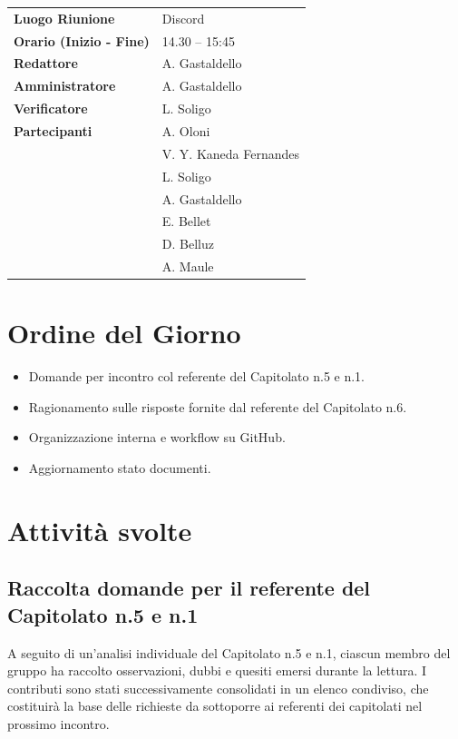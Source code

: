 \documentclass[a4paper,12pt]{article}
\begin{document}
\begin{tabular}{>{\bfseries}p{5cm} | p{10cm}}
Luogo Riunione & Discord \\[6pt]

Orario (Inizio - Fine) & 14.30 -- 15:45 \\[6pt]

Redattore &
  A. Gastaldello\\[6pt]

Amministratore & 
A. Gastaldello\\[6pt]

Verificatore &
L. Soligo\\[6pt]

Partecipanti &
  A. Oloni\\ &
    V. Y. Kaneda Fernandes\\&
  L. Soligo\\&
  A. Gastaldello\\&
  E. Bellet\\&
  D. Belluz\\&
  A. Maule\\[6pt]
  
\end{tabular}

\section{Ordine del Giorno}
    \begin{itemize}
    \item Domande per incontro col referente del Capitolato n.5 e n.1.
    \item Ragionamento sulle risposte fornite dal referente del Capitolato n.6.
    \item Organizzazione interna e workflow su GitHub.
    \item Aggiornamento stato documenti.
    \end{itemize}

\section{Attività svolte}
\subsection{Raccolta domande per il referente del Capitolato n.5 e n.1}
A seguito di un'analisi individuale del Capitolato n.5 e n.1, ciascun membro del gruppo ha raccolto osservazioni, dubbi e quesiti emersi durante la lettura. I contributi sono stati successivamente consolidati in un elenco condiviso, che costituirà la base delle richieste da sottoporre ai referenti dei capitolati nel prossimo incontro.
\end{document}
